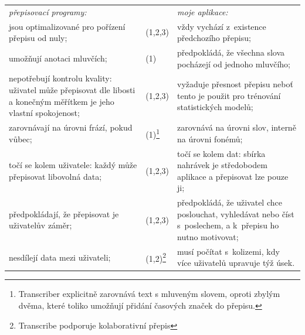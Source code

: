 \noindent
\begin{tabularx}{\textwidth}{
    @{\hspace{1.5em}}%
    >{{\hsize=0.9\hsize}\leavevmode\llap{\textbullet~}\raggedright}%
    X%
    @{\hspace{0.2em}}
    >{\hsize=0.2\hsize}
    X
    @{\quad\hspace{1.5em}}%
    >{\leavevmode\llap{\textbullet~}\raggedright\arraybackslash}%
    X%
    @{}%
  }
  \em{přepisovací programy}: & & \em{moje aplikace}: \\
  jsou optimalizované pro pořízení přepisu od nuly; &
    (1,2,3) &
      vždy vychází z~existence předchozího přepisu; \\

  umožňují anotaci mluvčích; &
    (1) &
      předpokládá, že všechna slova pocházejí od jednoho mluvčího; \\

  nepotřebují kontrolu kvality: uživatel může přepisovat dle libosti a konečným
  měřítkem je jeho vlastní spokojenost; &
    (1,2,3) &
      vyžaduje přesnost přepisu neboť tento je použit pro trénování
      statistických modelů; \\

  zarovnávají na úrovni frází, pokud vůbec; &
    (1)\footnote{
        Transcriber explicitně zarovnává text s mluveným slovem, oproti zbylým
        dvěma, které toliko umožňují přidání časových značek do přepisu.
    } &
      zarovnává na úrovni slov, interně na úrovni fonémů; \\

  točí se kolem uživatele: každý může přepisovat libovolná data; &
    (1,2,3) &
      točí se kolem dat: sbírka nahrávek je středobodem aplikace a přepisovat
      lze pouze ji; \\

  předpokládají, že přepisovat je uživatelův záměr; &
    (1,2,3) &
      předpokládá, že uživatel chce poslouchat, vyhledávat nebo číst
      s~poslechem, a k~přepisu ho nutno motivovat; \\

  nesdílejí data mezi uživateli; &
    (1,2)\footnote{Transcribe podporuje kolaborativní přepis} &
      musí počítat s~kolizemi, kdy více uživatelů upravuje týž úsek. \\
\end{tabularx}

